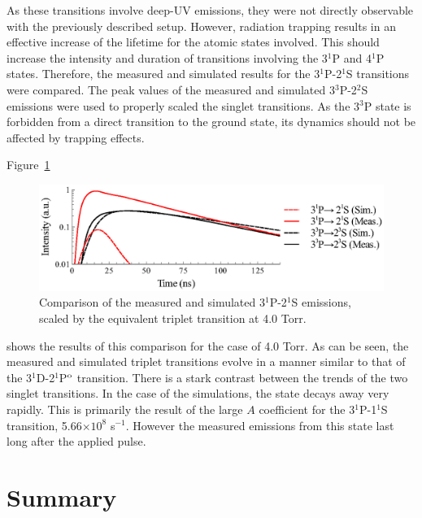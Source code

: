As these transitions involve deep-UV emissions, they were not directly
observable with the previously described setup. However, radiation trapping
results in an effective increase of the lifetime for the atomic states involved.
This should increase the intensity and duration of transitions involving the
3$^1$P and 4$^1$P states. Therefore, the measured and simulated results for the
3$^1$P-2$^1$S transitions were compared. The peak values of the measured and
simulated 3$^3$P-2$^2$S emissions were used to properly scaled the singlet
transitions. As the 3$^3$P state is forbidden from a direct transition to the
ground state, its dynamics should not be affected by trapping effects.

Figure~\ref{fig:pstates}
\begin{figure}
  \centering
  \includegraphics{./chapters/emissions/figures/pstates.eps}
  \caption{Comparison of the measured and simulated 3$^1$P-2$^1$S emissions,
  scaled by the equivalent triplet transition at 4.0 Torr.}
  \label{fig:pstates}
\end{figure}
shows the results of this comparison for the case of 4.0 Torr. As can be seen,
the measured and simulated triplet transitions evolve in a manner similar to
that of the 3$^1$D-2$^1$P$^\mathrm{o}$ transition. There is a stark contrast between
the trends of the two singlet transitions. In the case of the simulations, the
state decays away very rapidly. This is primarily the result of the large $A$
coefficient for the 3$^1$P-1$^1$S transition, 5.66$\times10^{8}$ s$^{-1}$.
However the measured emissions from this state last long after the applied
pulse. 



\section{Summary}
